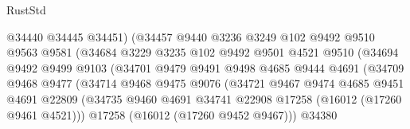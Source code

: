 \begin{lexlean}{RustStd}
\begin{coremodule}
                                  @34440
                                  @34445
                                  @34451)
                                (@34457
                                  @9440
                                  @3236
                                  @3249
                                  @102
                                  @9492
                                  @9510
                                  @9563
                                  @9581
                                  (@34684
                                    @3229
                                    @3235
                                    @102
                                    @9492
                                    @9501
                                    @4521
                                    @9510
                                    (@34694
                                      @9492
                                      @9499
                                      @9103
                                      (@34701
                                        @9479
                                        @9491
                                        @9498
                                        @4685
                                        @9444
                                        @4691
                                        (@34709
                                          @9468
                                          @9477
                                          (@34714
                                            @9468
                                            @9475
                                            @9076
                                            (@34721
                                              @9467
                                              @9474
                                              @4685
                                              @9451
                                              @4691
                                              @22809
                                              (@34735
                                                @9460
                                                @4691
                                                @34741
                                                @22908
                                                @17258
                                                (@16012 (@17260 @9461 @4521)))
                                              @17258
                                              (@16012 (@17260 @9452 @9467)))
                                            @34380

\end{coremodule}
\end{lexlean}
